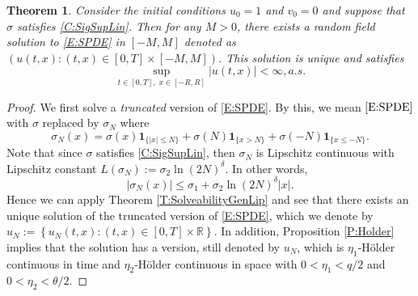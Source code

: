 \documentclass[a4paper,11pt]{article}
\numberwithin{equation}{section}
\theoremstyle{plain}
\newtheorem{theorem}{Theorem}[section]
\theoremstyle{definition}
\newcommand{\R}{\mathbb{R}}
\numberwithin{NQ}{section}
\numberwithin{LQ}{section}
\numberwithin{ZQ}{section}
\begin{document}
	\begin{theorem}
		Consider the initial conditions $u_0=1$ and $v_0=0$ and suppose that $\sigma$ satisfies \eqref{C:SigSupLin}. Then for any $M>0$, there exists a random field solution to \eqref{E:SPDE} in $[-M,M]$ denoted as $(u(t,x): (t,x) \in [0,T]\times[-M,M])$. This solution is unique and satisfies 
		\begin{equation}
		\sup_{t\in[0,T],\; x\in[-R,R]} |u(t,x)| < \infty, a.s.
		\end{equation}
	\end{theorem}
	
	\begin{proof}
		We first solve a {\it truncated} version of \eqref{E:SPDE}. By this, we mean $\eqref{E:SPDE}$ with $\sigma$ replaced by $\sigma_N$ where 
		\[
		\sigma_N(x) = \sigma(x)\textbf{1}_{\{|x| \le N\}} + \sigma(N)\textbf{1}_{\{x  >N\}} + \sigma(-N)\textbf{1}_{\{x \le -N\}}.
		\]
		Note that since $\sigma$ satisfies \eqref{C:SigSupLin}, then $\sigma_N$ is Lipschitz continuous with Lipschitz constant $L(\sigma_N) := \sigma_2 \ln(2N)^{\delta}$. In other words, 
		\[
		|\sigma_N(x)| \le \sigma_1 + \sigma_2 \ln(2N)^{\delta}|x|.
		\]
		Hence we can apply Theorem \ref{T:SolveabilityGenLip} and see that there exists an unique solution of the truncated version of \eqref{E:SPDE}, which we denote by $u_N := \left\{ u_N(t,x) : (t,x) \in [0,T] \times \R \right\}$. In addition, Proposition \ref{P:Holder} implies that the solution has a version, still denoted by $u_N$, which is $\eta_1$-H\"older continuous in time and $\eta_2$-H\"older continuous in space  with $0<\eta_1 < q/2$ and $0<\eta_2 < \theta/2$.
		

\end{proof}
\end{document}
